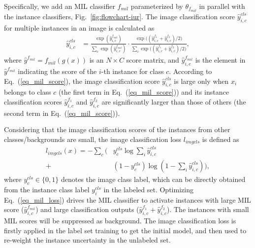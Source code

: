 \documentclass[final]{cvpr}
\begin{document}
Specifically, we add an MIL classifier $f_{mil}$ parameterized by $\theta_{f_{mil}}$ in parallel with the instance classifiers, Fig.~\ref{fig:flowchart-iur}. The image classification score $\hat{y}^{cls}_{i,c}$ for multiple instances in an image is calculated as
\begin{equation}
    \label{eq_mil_score}
    \begin{split}
        \hat{y}^{cls}_{i,c} & = \frac{\exp(\hat{y}^{f_{mil}}_{i,c})}{\sum_c{\exp(\hat{y}^{f_{mil}}_{i,c})}} \cdot 
        \frac{\exp {\Big(}(\hat{{y}}^{f_1}_{i,c} + \hat{{y}}^{f_2}_{i,c})/2{\Big)}}{\sum_i \exp {\Big(}(\hat{{y}}^{f_1}_{i,c} + \hat{{y}}^{f_2}_{i,c})/2{\Big)}},
    \end{split}
\end{equation}
where ${\hat{y}^{f_{mil}}} = f_{mil}(g(x))$ is an $N\times C$ score matrix, and $\hat{y}^{f_{mil}}_{i,c}$ is the element in $\hat{y}^{f_{mil}}$ indicating the score of the $i$-th instance for class $c$. According to Eq.~(\ref{eq_mil_score}), the image classification score $\hat{y}^{cls}_{i,c}$ is large only when $x_i$ belongs to class $c$ (the first term in Eq.~(\ref{eq_mil_score})) and its instance classification scores $\hat{{y}}^{f_1}_{i,c}$ and $\hat{{y}}^{f_2}_{i,c}$ are significantly larger than those of others (the second term in Eq.~(\ref{eq_mil_score})). 

Considering that the image classification scores of the instances from other classes/backgrounds are small, the image classification loss $l_{imgcls}$ is defined as
\begin{equation}
    \label{eq_mil_loss}
    \begin{split}
        l_{imgcls}(x) 
        = - \sum_c {\Big(} & {y^{cls}_c}\log\sum_i \hat{y}^{cls}_{i,c} \\
                  + & (1-{y^{cls}_c})\log (1-\sum_i \hat{y}^{cls}_{i,c}){\Big)},
    \end{split}
\end{equation}
where $y^{cls}_c \in \{0, 1\}$ denotes the image class label, which can be directly obtained from the instance class label $y_i^{cls}$ in the labeled set.
Optimizing Eq.~(\ref{eq_mil_loss}) drives the MIL classifier to activate instances with large MIL score ($\hat{y}^{f_{mil}}_{i,c}$) and large classification outputs ($\hat{{y}}^{f_1}_{i,c} + \hat{{y}}^{f_2}_{i,c}$). 
The instances with small MIL scores will be suppressed as background. The image classification loss is firstly applied in the label set training to get the initial model, and then used to re-weight the instance uncertainty in the unlabeled set.
\end{document}

